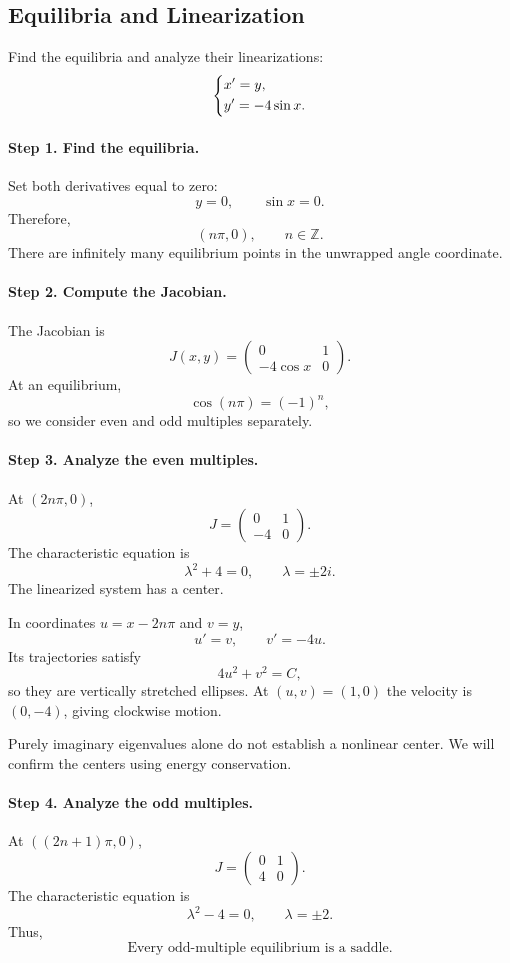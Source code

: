 \documentclass[11pt,letterpaper]{article}
\begin{document}
\subsection{Equilibria and Linearization}

\begin{example}[1]{
Find the equilibria and analyze their linearizations:
\[
\begin{dcases}
x'=y,\\
y'=-4\sin x.
\end{dcases}
\]
}

\paragraph{Step 1. Find the equilibria.}
Set both derivatives equal to zero:
\[
y=0,\qquad \sin x=0.
\]
Therefore,
\[
\boxed{(n\pi,0),\qquad n\in\mathbb Z.}
\]
There are infinitely many equilibrium points
in the unwrapped angle coordinate.

\paragraph{Step 2. Compute the Jacobian.}
The Jacobian is
\[
\boxed{
J(x,y)=
\begin{pmatrix}
0&1\\
-4\cos x&0
\end{pmatrix}.
}
\]
At an equilibrium,
\[
\cos(n\pi)=(-1)^n,
\]
so we consider even and odd multiples separately.

\paragraph{Step 3. Analyze the even multiples.}
At $(2n\pi,0)$,
\[
J=
\begin{pmatrix}
0&1\\
-4&0
\end{pmatrix}.
\]
The characteristic equation is
\[
\lambda^2+4=0,
\qquad \lambda=\pm2i.
\]
The linearized system has a center.

In coordinates $u=x-2n\pi$ and $v=y$,
\[
u'=v,\qquad v'=-4u.
\]
Its trajectories satisfy
\[
4u^2+v^2=C,
\]
so they are vertically stretched ellipses.
At $(u,v)=(1,0)$ the velocity is $(0,-4)$,
giving clockwise motion.

Purely imaginary eigenvalues alone do not establish
a nonlinear center. We will confirm the centers
using energy conservation.

\paragraph{Step 4. Analyze the odd multiples.}
At $((2n+1)\pi,0)$,
\[
J=
\begin{pmatrix}
0&1\\
4&0
\end{pmatrix}.
\]
The characteristic equation is
\[
\lambda^2-4=0,
\qquad \lambda=\pm2.
\]
Thus,
\[
\boxed{\text{Every odd-multiple equilibrium is a saddle}.}
\]


\end{example}
\end{document}
